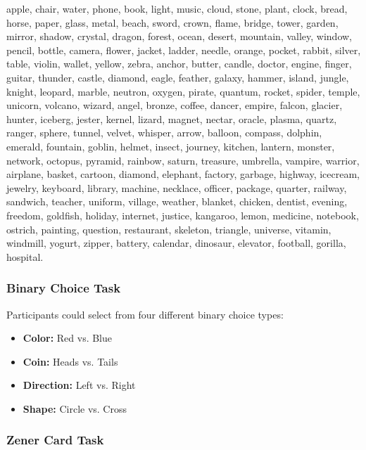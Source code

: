 \documentclass[12pt]{article} %
\begin{document}
\vspace{0.8em}

\noindent
apple, chair, water, phone, book, light, music, cloud, stone, plant, clock, bread, horse, paper, glass, metal, 
beach, sword, crown, flame, bridge, tower, garden, mirror, shadow, crystal, dragon, forest, ocean, desert, mountain, valley, 
window, pencil, bottle, camera, flower, jacket, ladder, needle, orange, pocket, rabbit, silver, table, violin, wallet, yellow, 
zebra, anchor, butter, candle, doctor, engine, finger, guitar, thunder, castle, diamond, eagle, feather, galaxy, hammer, island, 
jungle, knight, leopard, marble, neutron, oxygen, pirate, quantum, rocket, spider, temple, unicorn, volcano, wizard, angel, bronze, 
coffee, dancer, empire, falcon, glacier, hunter, iceberg, jester, kernel, lizard, magnet, nectar, oracle, plasma, quartz, ranger, 
sphere, tunnel, velvet, whisper, arrow, balloon, compass, dolphin, emerald, fountain, goblin, helmet, insect, journey, kitchen, lantern, 
monster, network, octopus, pyramid, rainbow, saturn, treasure, umbrella, vampire, warrior, airplane, basket, cartoon, diamond, elephant, 
factory, garbage, highway, icecream, jewelry, keyboard, library, machine, necklace, officer, package, quarter, railway, sandwich, teacher, 
uniform, village, weather, blanket, chicken, dentist, evening, freedom, goldfish, holiday, internet, justice, kangaroo, lemon, medicine, 
notebook, ostrich, painting, question, restaurant, skeleton, triangle, universe, vitamin, windmill, yogurt, zipper, battery, calendar, 
dinosaur, elevator, football, gorilla, hospital.

\subsubsection*{Binary Choice Task}

Participants could select from four different binary choice types:
\begin{itemize}
    \item \textbf{Color:} Red vs. Blue
    \item \textbf{Coin:} Heads vs. Tails
    \item \textbf{Direction:} Left vs. Right
    \item \textbf{Shape:} Circle vs. Cross
\end{itemize}

\subsubsection*{Zener Card Task}
\end{document}
